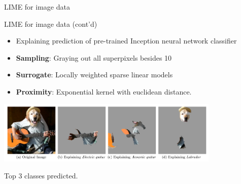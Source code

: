 \documentclass[11pt,compress,t,notes=noshow, aspectratio=169, xcolor=table]{beamer}
\begin{document}
\begin{frame}[c]{LIME for image data}
\end{frame}
\begin{frame}{LIME for image data (cont'd) }
	\begin{itemize}
		\item Explaining prediction of pre-trained Inception neural network classifier
		\item \textbf{Sampling}: Graying out all superpixels besides 10
		\item \textbf{Surrogate}: Locally weighted sparse linear models 
		\item \textbf{Proximity}: Exponential kernel with euclidean distance.
	\end{itemize}
	\vspace{-0.3cm}
	\begin{center}
		\includegraphics[width=0.8\textwidth]{figure/lime-images}
		
		{Top 3 classes predicted.}
	\end{center}
	
\end{frame}
\endlecture
\end{document}
